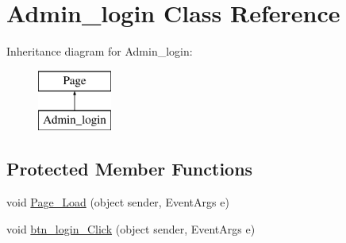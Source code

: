 \hypertarget{class_admin__login}{}\section{Admin\+\_\+login Class Reference}
\label{class_admin__login}
Inheritance diagram for Admin\+\_\+login\+:\begin{figure}[H]
\begin{center}
\leavevmode
\includegraphics[height=2.000000cm]{class_admin__login}
\end{center}
\end{figure}
\subsection*{Protected Member Functions}
\begin{DoxyCompactItemize}
\item 
void \mbox{\hyperlink{class_admin__login_ac7ea79ef6799726f0c6dc5bfda4847dd}{Page\+\_\+\+Load}} (object sender, Event\+Args e)
\item 
void \mbox{\hyperlink{class_admin__login_a2fdd70d2b33f4c8a85faebbe31f25147}{btn\+\_\+login\+\_\+\+Click}} (object sender, Event\+Args e)
\end{DoxyCompactItemize}
